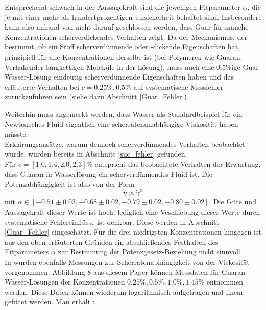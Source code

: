 \documentclass[11pt,a4paper,oneside]{scrartcl}
\begin{document}
Entsprechend schwach in der Aussagekraft sind die jeweiligen Fitparameter $\alpha$, die je mit einer mehr als hundertprozentigen Unsicherheit behaftet sind. Insbesondere kann also anhand von  nicht darauf geschlossen werden, dass Guar für manche Konzentrationen scherverdickendes Verhalten zeigt. Da der Mechanismus, der bestimmt, ob ein Stoff scherverdünnende oder -dickende Eigenschaften hat, prinzipiell für alle Konzentrationen derselbe ist (bei Polymeren wie Guaran: \glqq Verhaken\Grqq der langkettigen Moleküle in der Lösung), muss auch eine $0.5\%$ige Guar-Wasser-Lösung eindeutig scherverdünnende Eigenschaften haben und das erläuterte Verhalten bei $c=0.25\%,0.5\%$ auf systematische Messfehler zurückzuführen sein (siehe dazu Abschnitt \ref{Guar_Fehler}).\par
Weiterhin muss angemerkt werden, dass Wasser als Standardbeispiel für ein Newtonsches Fluid eigentlich eine scherratenunabhängige Viskosität haben müsste. \\ Erklärungsansätze, warum dennoch scherverdünnendes Verhalten beobachtet wurde, wurden bereits in Abschnitt \ref{suc_fehler} gefunden.\\
Für $c=[1.0,1.4,2.0,2.3]\%$ entspricht das beobachtete Verhalten der Erwartung, dass Guaran in Wasserlösung ein scherverdünnendes Fluid ist. Die Potenzabhängigkeit ist also von der Form \begin{equation}\eta\propto\dot\gamma^\alpha\end{equation} mit $\alpha\in[-0.51\pm0.03,-0.68\pm0.02,-0.79\pm0.02,-0.80\pm0.02]$. Die Güte und Aussagekraft dieser Werte ist hoch; lediglich eine Veschiebung dieser Werte durch systematische Fehlereinflüsse ist denkbar. Diese werden in Abschnitt \ref{Guar_Fehler} eingeschätzt. Für die drei niedrigsten Konzentrationen hingegen ist aus den oben erläuterten Gründen ein abschließendes Festhalten des Fitparameters $\alpha$ zur Bestmmung der Potenzgesetz-Beziehung nicht sinnvoll. \\
In \cite{rheology_guar_gum} wurden ebenfalls Messungen zur Scherratenabhängigkeit von der Viskosität vorgenommen. Abbildung 8 aus diesem Paper können Messdaten für Guaran-Wasser-Lösungen der Konzentrationen $0.25\%,0.5\%,1.0\%,1.45\%$ entnommen werden. Diese Daten können wiederum logarithmisch aufgetragen und linear gefittet werden. Man erhält :
\end{document}
